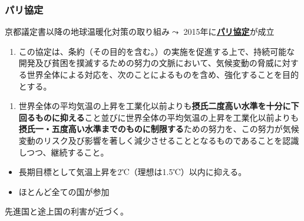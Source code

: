 \documentclass[
  xelatex,
  ja=standard]{bxjsarticle}
\providecommand{\tightlist}{%
  \setlength{\itemsep}{0pt}\setlength{\parskip}{0pt}}\usepackage{longtable,booktabs,array}
\begin{document}
\hypertarget{ux30d1ux30eaux5354ux5b9a}{%
\subsubsection{パリ協定}\label{ux30d1ux30eaux5354ux5b9a}}

京都議定書以降の地球温暖化対策の取り組み\(\leadsto\)
2015年に\href{https://www.mofa.go.jp/mofaj/ic/ch/page1w_000119.html}{\textbf{パリ協定}}が成立

\begin{tcolorbox}[enhanced jigsaw, title=\textcolor{quarto-callout-note-color}{\faInfo}\hspace{0.5em}{\href{https://www.env.go.jp/earth/ondanka/cop/shiryo.html}{パリ協定}　第2条}, bottomtitle=1mm, rightrule=.15mm, breakable, arc=.35mm, leftrule=.75mm, opacityback=0, colbacktitle=quarto-callout-note-color!10!white, left=2mm, coltitle=black, toptitle=1mm, titlerule=0mm, colback=white, bottomrule=.15mm, toprule=.15mm, colframe=quarto-callout-note-color-frame, opacitybacktitle=0.6]

\begin{enumerate}
\def\labelenumi{\arabic{enumi}.}
\tightlist
\item
  この協定は、条約（その目的を含む。）の実施を促進する上で、持続可能な開発及び貧困を撲滅するための努力の文脈において、気候変動の脅威に対する世界全体による対応を、次のことによるものを含め、強化することを目的とする。
\end{enumerate}

\begin{enumerate}
\def\labelenumi{\alph{enumi}.}
\tightlist
\item
  世界全体の平均気温の上昇を工業化以前よりも\textbf{摂氏二度高い水準を十分に下回るものに抑える}こと並びに世界全体の平均気温の上昇を工業化以前よりも\textbf{摂氏一・五度高い水準までのものに制限する}ための努力を、この努力が気候変動のリスク及び影響を著しく減少させることとなるものであることを認識しつつ、継続すること。
\end{enumerate}

\end{tcolorbox}

\begin{itemize}
\tightlist
\item
  長期目標として気温上昇を2℃（理想は1.5℃）以内に抑える。
\item
  ほとんど全ての国が参加
\end{itemize}

先進国と途上国の利害が近づく。
\end{document}
